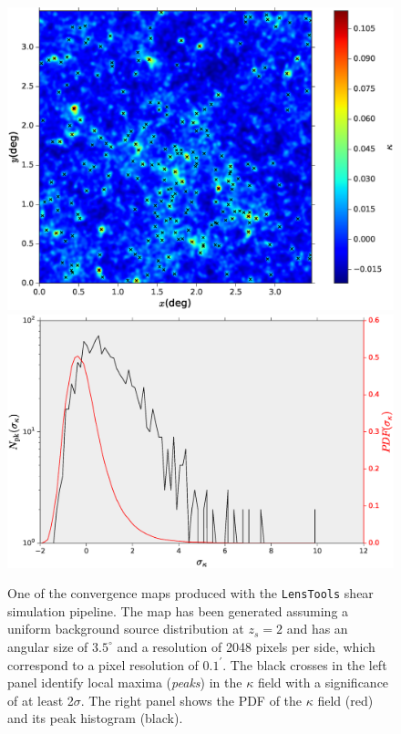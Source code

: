 \documentclass[reprint,aps,prd,superscriptaddress,showkeys,showpacs]{revtex4-1}
\newcommand{\LT}{\texttt{LensTools} }
\begin{document}
\begin{figure}
\includegraphics[scale=0.3]{Figures/convergence_visualize.eps}
\includegraphics[scale=0.3]{Figures/convergence_stats.eps}
\caption{One of the convergence maps produced with the \LT shear simulation pipeline. The map has been generated assuming a uniform background source distribution at $z_s=2$ and has an angular size of $3.5^\circ$ and a resolution of 2048 pixels per side, which correspond to a pixel resolution of $0.1^\prime$. The black crosses in the left panel identify local maxima (\textit{peaks}) in the $\kappa$ field with a significance of at least 2$\sigma$. The right panel shows the PDF of the $\kappa$ field (red) and its peak histogram (black).}
\label{convergencefig}
\end{figure}
\end{document}
